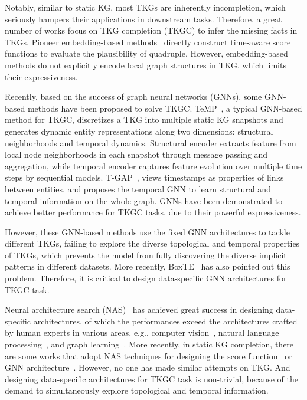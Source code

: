 \documentclass[11pt]{article}
\begin{document}
Notably, 
similar to static KG, 
most TKGs are inherently incompletion, 
which seriously hampers their applications in downstream tasks.
Therefore, 
a great number of works focus on TKG completion (TKGC) to infer the missing facts in TKGs.
Pioneer embedding-based methods~\citep{leblay2018deriving,dasgupta-etal-2018-hyte,goel2020diachronic,lacroix2020tensor} 
directly construct time-aware score functions 
to evaluate the plausibility of quadruple.
However, 
embedding-based methods 
do not explicitly encode local graph structures in TKG, 
which limits their expressiveness.

Recently,
based on the success of graph neural networks (GNNs), 
some GNN-based methods have been proposed to solve TKGC.
TeMP~\citep{wu-etal-2020-temp}, 
a typical GNN-based method for TKGC, 
discretizes a TKG into multiple static KG snapshots and generates dynamic entity representations along two dimensions: structural neighborhoods and temporal dynamics. 
Structural encoder extracts feature from local node neighborhoods in each snapshot through message passing and aggregation, 
while temporal encoder captures feature evolution over multiple time steps by sequential models. 
T-GAP~\citep{jung2021learning}, 
views timestamps as properties of links between entities, 
and proposes the temporal GNN to learn structural and temporal information on the whole graph.  
GNNs have been demonstrated to achieve better performance for TKGC tasks, 
due to their powerful expressiveness.

However, 
these GNN-based methods 
use the fixed GNN architectures to tackle different TKGs, 
failing to explore the diverse topological and temporal properties of TKGs, 
which prevents the model from fully discovering the diverse implicit patterns in different datasets. 
More recently, 
BoxTE~\citep{messner2022temporal} has also pointed out this problem. 
Therefore, 
it is critical to design data-specific GNN architectures for TKGC task.

Neural architecture search (NAS)~\citep{yao2018taking, hutter2019automated} 
has achieved great success in designing data-specific architectures, 
of which the performances exceed the architectures crafted by human experts in various areas, 
e.g., computer vision~\citep{zhang2022searching}, 
natural language processing~\citep{so2019evolved}, 
and graph learning~\citep{zhang2021automated}. 
More recently, 
in static KG completion, 
there are some works that adopt NAS techniques for designing the score function~\citep{zhang2022bilinear} 
or GNN architecture~\citep{wang2021autogel}. 
However, 
no one has made similar attempts on TKG. 
And designing data-specific architectures for TKGC task is non-trivial, 
because of the demand to simultaneously explore topological and temporal information.
\end{document}
